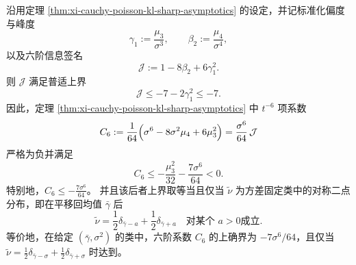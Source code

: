 \begin{proposition}[六阶信息签名的普适负号与二点刚性]\label{prop:xi-cauchy-poisson-sixth-signature-negativity-rigidity}
沿用定理 \ref{thm:xi-cauchy-poisson-kl-sharp-asymptotics} 的设定，并记标准化偏度与峰度
\[
\gamma_1:=\frac{\mu_3}{\sigma^3},
\qquad
\beta_2:=\frac{\mu_4}{\sigma^4},
\]
以及六阶信息签名
\[
\mathcal J:=1-8\beta_2+6\gamma_1^2.
\]
则 \(\mathcal J\) 满足普适上界
\begin{equation}\label{eq:xi-cauchy-poisson-sixth-signature-upper-bound}
\boxed{\;
\mathcal J\le -7-2\gamma_1^2\le -7.\;}
\end{equation}
因此，定理 \ref{thm:xi-cauchy-poisson-kl-sharp-asymptotics} 中 \(t^{-6}\) 项系数
\[
C_6
:=\frac{1}{64}\Bigl(\sigma^6-8\sigma^2\mu_4+6\mu_3^2\Bigr)
=\frac{\sigma^6}{64}\,\mathcal J
\]
严格为负并满足
\begin{equation}\label{eq:xi-cauchy-poisson-sixth-coefficient-negative}
\boxed{\;
C_6\le -\frac{\mu_3^2}{32}-\frac{7\sigma^6}{64}<0.\;}
\end{equation}
特别地，\(C_6\le -\frac{7\sigma^6}{64}\)。
并且该后者上界取等当且仅当 \(\tilde\nu\) 为方差固定类中的对称二点分布，即在平移回均值 \(\bar\gamma\) 后
\begin{equation}\label{eq:xi-cauchy-poisson-sixth-rigidity-two-point}
\boxed{\;
\tilde\nu=\frac12\delta_{\bar\gamma-a}+\frac12\delta_{\bar\gamma+a}
\quad\text{对某个 }a>0\text{成立}. \;}
\end{equation}
等价地，在给定 \((\bar\gamma,\sigma^2)\) 的类中，六阶系数 \(C_6\) 的上确界为 \(-7\sigma^6/64\)，且仅当 \(\tilde\nu=\frac12\delta_{\bar\gamma-\sigma}+\frac12\delta_{\bar\gamma+\sigma}\) 时达到。
\end{proposition}
